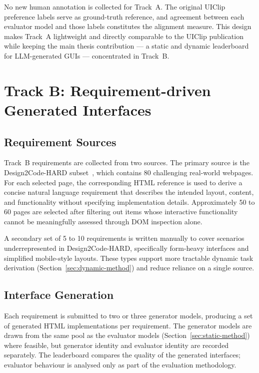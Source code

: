 No new human annotation is collected for Track~A.
The original UIClip preference labels serve as ground-truth reference,
and agreement between each evaluator model and those labels constitutes
the alignment measure.
This design makes Track~A lightweight and directly comparable to
the UIClip publication while keeping the main thesis contribution —
a static and dynamic leaderboard for LLM-generated GUIs — concentrated
in Track~B.

\section{Track B: Requirement-driven Generated Interfaces}
\label{sec:track-b}

\subsection{Requirement Sources}

Track~B requirements are collected from two sources.
The primary source is the Design2Code-HARD subset~\cite{design2code},
which contains 80 challenging real-world webpages.
For each selected page, the corresponding HTML reference is used to
derive a concise natural language requirement that describes the
intended layout, content, and functionality without specifying
implementation details.
Approximately 50 to 60 pages are selected after filtering out items
whose interactive functionality cannot be meaningfully assessed
through DOM inspection alone.

A secondary set of 5 to 10 requirements is written manually to cover
scenarios underrepresented in Design2Code-HARD, specifically
form-heavy interfaces and simplified mobile-style layouts.
These types support more tractable dynamic task derivation
(Section~\ref{sec:dynamic-method}) and reduce reliance on a single
source.

\subsection{Interface Generation}

Each requirement is submitted to two or three generator models,
producing a set of generated HTML implementations per requirement.
The generator models are drawn from the same pool as the evaluator models
(Section~\ref{sec:static-method}) where feasible, but generator identity
and evaluator identity are recorded separately. The leaderboard compares the
quality of the generated interfaces; evaluator behaviour is analysed only as
part of the evaluation methodology.

